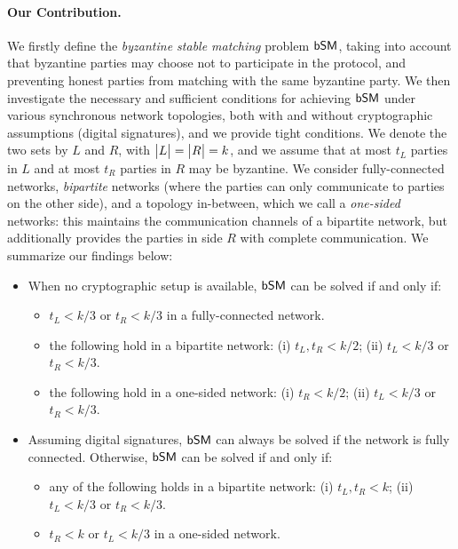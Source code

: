 \paragraph{Our Contribution.}
We firstly define the \emph{byzantine stable matching} problem $\textsf{bSM}$, taking into account that byzantine parties may choose not to participate in the protocol, and preventing honest parties from matching with the same byzantine party. We then investigate the necessary and sufficient conditions for achieving $\textsf{bSM}$ under various synchronous network topologies, both with and without cryptographic assumptions (digital signatures), and we provide tight conditions. 
We denote the two sets by $L$ and $R$, with $\big\lvert L\big\rvert = \big\lvert R\big\rvert = k$, and we assume that at most $t_L$ parties in $L$ and at most $t_R$ parties in $R$ may be byzantine.
We consider fully-connected networks, \emph{bipartite} networks (where the parties can only communicate to parties on the other side), and a topology in-between, which we call a \emph{one-sided} networks: this maintains the communication channels of a bipartite network, but additionally provides the parties in side $R$ with complete communication. 
We summarize our findings below:
\begin{itemize}[nosep,leftmargin=*]
    \item When no cryptographic setup is available, $\textsf{bSM}$ can be solved if and only if: 
    \begin{itemize}
        \item $t_L < k / 3$ or $t_R < k  / 3$ in a fully-connected network.
        \item the following hold in a bipartite network: (i) $t_L, t_R < k/2$; (ii) $t_L < k/3$ or $t_R < k/3$.
        \item the following hold in a one-sided network: (i) $t_R < k/2$; (ii)  $t_L < k/3$ or $t_R < k/3$.
    \end{itemize}
    \item Assuming digital signatures, $\textsf{bSM}$ can always be solved if the network is fully connected. Otherwise, $\textsf{bSM}$ can be solved if and only if:
    \begin{itemize}
        \item any of the following holds in a bipartite network: (i) $t_L, t_R < k$; (ii) $t_L < k/3$ or $t_R < k/3$.
        \item $t_R < k$ or $t_L < k / 3$ in a one-sided network.
    \end{itemize}
\end{itemize}

